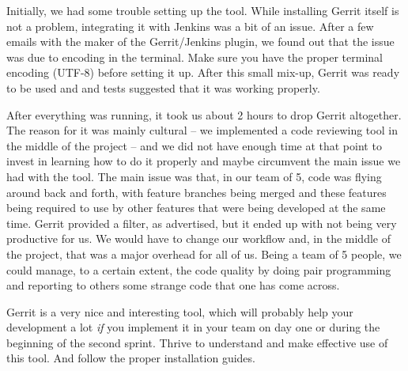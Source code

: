 Initially, we had some trouble setting up the tool. While installing Gerrit itself is not a problem, integrating it with Jenkins was a bit of an issue. After a few emails with the maker of the Gerrit/Jenkins plugin, we found out that the issue was due to encoding in the terminal. Make sure you have the proper terminal encoding (UTF-8) before setting it up. After this small mix-up, Gerrit was ready to be used and and tests suggested that it was working properly.

After everything was running, it took us about 2 hours to drop Gerrit altogether. The reason for it was mainly cultural -- we implemented a code reviewing tool in the middle of the project -- and we did not have enough time at that point to invest in learning how to do it properly and maybe circumvent the main issue we had with the tool. The main issue was that, in our team of 5, code was flying around back and forth, with feature branches being merged and these features being required to use by other features that were being developed at the same time. Gerrit provided a filter, as advertised, but it ended up with not being very productive for us. We would have to change our workflow and, in the middle of the project, that was a major overhead for all of us. Being a team of 5 people, we could manage, to a certain extent, the code quality by doing pair programming and reporting to others some strange code that one has come across.

Gerrit is a very nice and interesting tool, which will probably help your development a lot \emph{if} you implement it in your team on day one or during the beginning of the second sprint. Thrive to understand and make effective use of this tool. And follow the proper installation guides.
